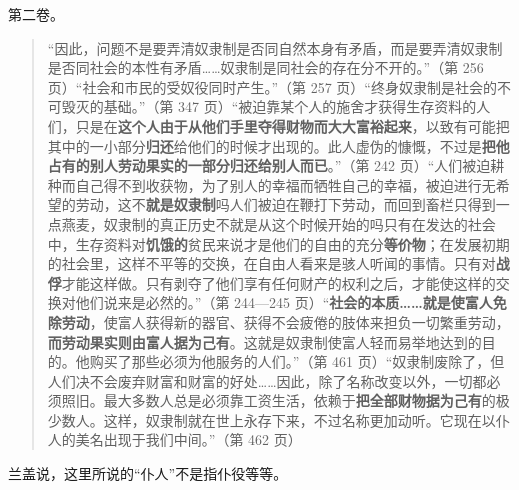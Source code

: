 第二卷。

\begin{quote}“因此，问题不是要弄清奴隶制是否同自然本身有矛盾，而是要弄清奴隶制是否同社会的本性有矛盾……奴隶制是同社会的存在分不开的。”（第 256 页）“社会和市民的受奴役同时产生。”（第 257 页）“终身奴隶制是社会的不可毁灭的基础。”（第 347 页）“被迫靠某个人的施舍才获得生存资料的人们，只是在\textbf{这个人由于从他们手里夺得财物而大大富裕起来}，以致有可能把其中的一小部分\textbf{归还}给他们的时候才出现的。此人虚伪的慷慨，不过是\textbf{把他占有的别人劳动果实的一部分归还给别人而已}。”（第 242 页）“人们被迫耕种而自己得不到收获物，为了别人的幸福而牺牲自己的幸福，被迫进行无希望的劳动，这不\textbf{就是奴隶制}吗人们被迫在鞭打下劳动，而回到畜栏只得到一点燕麦，奴隶制的真正历史不就是从这个时候开始的吗只有在发达的社会中，生存资料对\textbf{饥饿的}贫民来说才是他们的自由的充分\textbf{等价物}；在发展初期的社会里，这样不平等的交换，在自由人看来是骇人听闻的事情。只有对\textbf{战俘}才能这样做。只有剥夺了他们享有任何财产的权利之后，才能使这样的交换对他们说来是必然的。”（第 244—245 页）“\textbf{社会的本质……就是使富人免除劳动}，使富人获得新的器官、获得不会疲倦的肢体来担负一切繁重劳动，\textbf{而劳动果实则由富人据为己有}。这就是奴隶制使富人轻而易举地达到的目的。他购买了那些必须为他服务的人们。”（第 461 页）“奴隶制废除了，但人们决不会废弃财富和财富的好处……因此，除了名称改变以外，一切都必须照旧。最大多数人总是必须靠工资生活，依赖于\textbf{把全部财物据为己有}的极少数人。这样，奴隶制就在世上永存下来，不过名称更加动听。它现在以仆人的美名出现于我们中间。”（第 462 页）\end{quote}

兰盖说，这里所说的“仆人”不是指仆役等等。

